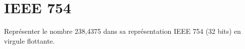 \documentclass[a4paper,11pt]{article}
\begin{document}
\section{IEEE 754}

Représenter le nombre 238,4375 dans sa représentation IEEE 754 (32 bits) en virgule flottante.







\end{document}
